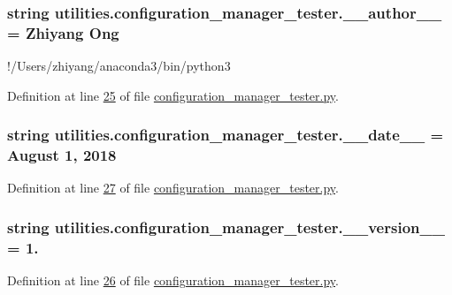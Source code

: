 \subsubsection[{\+\_\+\+\_\+author\+\_\+\+\_\+}]{\setlength{\rightskip}{0pt plus 5cm}string utilities.\+configuration\+\_\+manager\+\_\+tester.\+\_\+\+\_\+author\+\_\+\+\_\+ = \textquotesingle{}Zhiyang Ong\textquotesingle{}}\label{namespaceutilities_1_1configuration__manager__tester_aa6fa7c3492580a61698b531deb1df918}


!/\+Users/zhiyang/anaconda3/bin/python3 



Definition at line \hyperlink{configuration__manager__tester_8py_source_l00025}{25} of file \hyperlink{configuration__manager__tester_8py_source}{configuration\+\_\+manager\+\_\+tester.\+py}.

\hypertarget{namespaceutilities_1_1configuration__manager__tester_ac13eba5bd97c2c6945d9195a63f2ee1b}{}
\subsubsection[{\+\_\+\+\_\+date\+\_\+\+\_\+}]{\setlength{\rightskip}{0pt plus 5cm}string utilities.\+configuration\+\_\+manager\+\_\+tester.\+\_\+\+\_\+date\+\_\+\+\_\+ = \textquotesingle{}August 1, 2018\textquotesingle{}}\label{namespaceutilities_1_1configuration__manager__tester_ac13eba5bd97c2c6945d9195a63f2ee1b}


Definition at line \hyperlink{configuration__manager__tester_8py_source_l00027}{27} of file \hyperlink{configuration__manager__tester_8py_source}{configuration\+\_\+manager\+\_\+tester.\+py}.

\hypertarget{namespaceutilities_1_1configuration__manager__tester_a5106d1471e1cb4d2b0f14486768f1096}{}
\subsubsection[{\+\_\+\+\_\+version\+\_\+\+\_\+}]{\setlength{\rightskip}{0pt plus 5cm}string utilities.\+configuration\+\_\+manager\+\_\+tester.\+\_\+\+\_\+version\+\_\+\+\_\+ = \textquotesingle{}1.\textquotesingle{}}\label{namespaceutilities_1_1configuration__manager__tester_a5106d1471e1cb4d2b0f14486768f1096}


Definition at line \hyperlink{configuration__manager__tester_8py_source_l00026}{26} of file \hyperlink{configuration__manager__tester_8py_source}{configuration\+\_\+manager\+\_\+tester.\+py}.

